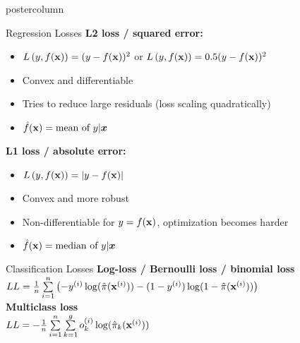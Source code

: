 \documentclass{beamer}
\begin{document}
\begin{frame}[fragile]{}
\begin{columns}
\begin{column}{.31\textwidth}
\begin{beamercolorbox}[center]{postercolumn}
\begin{minipage}{.98\textwidth}
{%
\begin{myblock}{Regression Losses}
  \textbf{L2 loss / squared error:} 
\begin{itemize}    
  \setlength{\itemindent}{+.3in}
  \item $L\left(y, f(\mathbf{x})\right) = (y-f(\mathbf{x}))^2$ or $L\left(y, f(\mathbf{x})\right) = 0.5 (y-f(\mathbf{x}))^2$
  \item Convex and differentiable
  \item Tries to reduce large residuals (loss scaling quadratically)
  \item $\hat{f}(\mathbf{x}) = \text{mean of } y | \bm{x}$
\end{itemize}

\vspace*{1ex}


  \textbf{L1 loss / absolute error:} 
\begin{itemize}
\setlength{\itemindent}{+.3in}
  \item $L\left(y, f(\mathbf{x})\right) = |y-f(\mathbf{x})|$
  \item Convex and more robust
  \item Non-differentiable for $y = f(\mathbf{x})$, optimization becomes harder
  \item $\hat{f}(\mathbf{x}) = \text{median of } y | \bm{x}$     
\end{itemize}
\end{myblock}

\begin{myblock}{Classification Losses}
  \textbf{Log-loss / Bernoulli loss / binomial loss}\\
  $LL = \frac{1}{n} \sum\limits_{i=1}^n \left( - y^{(i)} \log(\hat \pi(\mathbf{x}^{(i)})) - (1-y^{(i)}) \log(1-\hat \pi(\mathbf{x}^{(i)})) \right)$\\
  
  \textbf{Multiclass loss} \\
  $ LL = - \frac{1}{n} \sum\limits_{i=1}^n \sum\limits_{k=1}^g o_k^{(i)} \log(\hat \pi_{k}(\mathbf{x}^{(i)})) $  
\end{myblock}

}
\end{minipage}
\end{beamercolorbox}
\end{column}
\end{columns}
\end{frame}
\end{document}
